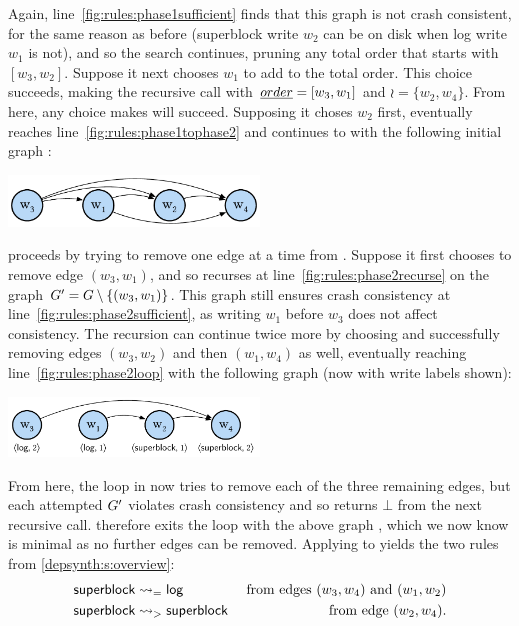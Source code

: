 \begin{example}
%
Again, line~\ref{fig:rules:phase1sufficient} finds that this graph is not crash consistent,
for the same reason as before (superblock write $w_2$ can be on disk when log write $w_1$ is not),
and so the search continues, pruning any total order that starts with $[w_3, w_2]$.
Suppose it next chooses $w_1$ to add to the total order.
This choice succeeds, making the recursive call with $\ord = [w_3, w_1]$ and $\wr = \{w_2, w_4\}$.
From here, any choice \phaseone makes will succeed.
Supposing it choses $w_2$ first,
\phaseone eventually reaches line~\ref{fig:rules:phase1tophase2} and continues to \phasetwo
with the following initial graph \gr:
%
\begin{center}\includegraphics[width=0.5\textwidth]{figs/sec4-3.pdf}\end{center}

\phasetwo proceeds by trying to remove one edge at a time from \gr.
Suppose it first chooses to remove edge $(w_3, w_1)$,
and so recurses at line~\ref{fig:rules:phase2recurse} on the graph $\gr' = \gr \setminus \{(w_3, w_1)\}$.
This graph still ensures crash consistency at line~\ref{fig:rules:phase2sufficient},
as writing $w_1$ before $w_3$ does not affect consistency.
The recursion can continue twice more
by choosing and successfully removing edges $(w_3, w_2)$ and then $(w_1, w_4)$ as well,
eventually reaching line~\ref{fig:rules:phase2loop} with the following graph \gr (now with write labels shown):\tighten
%
\begin{center}\includegraphics[width=0.5\textwidth]{figs/sec4-4.pdf}\end{center}
%
From here, the loop in \phasetwo now tries to remove each of the three remaining edges,
but each attempted $\gr'$ violates crash consistency and so returns $\bot$ from the next recursive call.
\phasetwo therefore exits the loop with the above graph \gr,
which we now know is minimal as no further edges can be removed.
Applying  to \gr yields the two rules from \cref{depsynth:s:overview}:
\begin{align*}
    \deprule{\textsf{superblock}&}{\textsf{log}}{=} & \text{ from edges } (w_3, w_4) \text{ and } (w_1, w_2) \\
    \deprule{\textsf{superblock}&}{\textsf{superblock}}{>} & \text{ from edge } (w_2, w_4).
\end{align*}
\end{example}


